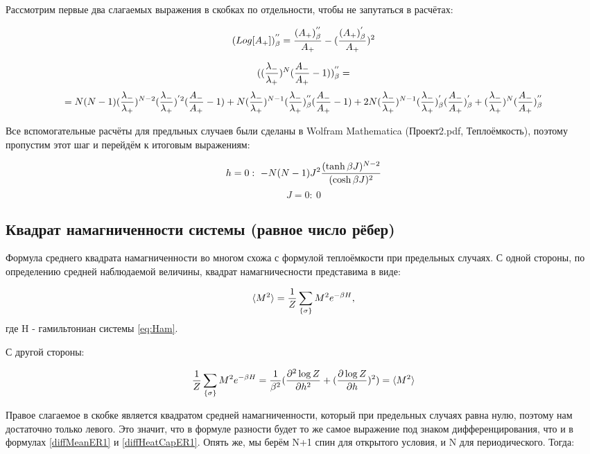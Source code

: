 Рассмотрим первые два слагаемых выражения в скобках по отдельности, чтобы не запутаться в расчётах:

\begin{equation*}
    (Log[A_{+}])^{''}_{\beta} = \frac{(A_{+})^{''}_{\beta}}{A_{+}} - (\frac{(A_{+})^{'}_{\beta}}{A_{+}})^{2}
\end{equation*}

\[ ((\frac{\lambda_{-}}{\lambda_{+}})^{N}(\frac{A_{-}}{A_{+}} - 1))^{''}_{\beta} = \]
\[ = N(N-1)(\frac{\lambda_{-}}{\lambda_{+}})^{N-2}(\frac{\lambda_{-}}{\lambda_{+}})^{'2}(\frac{A_{-}}{A_{+}} - 1) + N(\frac{\lambda_{-}}{\lambda_{+}})^{N-1}(\frac{\lambda_{-}}{\lambda_{+}})^{''}_{\beta}(\frac{A_{-}}{A_{+}} - 1) + 2N(\frac{\lambda_{-}}{\lambda_{+}})^{N-1}(\frac{\lambda_{-}}{\lambda_{+}})^{'}_{\beta}(\frac{A_{-}}{A_{+}})^{'}_{\beta} + (\frac{\lambda_{-}}{\lambda_{+}})^{N}(\frac{A_{-}}{A_{+}})^{''}_{\beta} \]

Все вспомогательные расчёты для предльных случаев были сделаны в Wolfram Mathematica (Проект2.pdf, Теплоёмкость)\cite{Git}, поэтому пропустим этот шаг и перейдём к итоговым выражениям:

\[ h = 0:\ -N(N-1)J^{2}\frac{(\tanh{\bj})^{N-2}}{(\cosh{\bj})^{2}} \]
\[ J = 0:\ 0\]

\subsection{Квадрат намагниченности системы (равное число рёбер)}

Формула среднего квадрата намагниченности во многом схожа с формулой теплоёмкости при предельных случаях. С одной стороны, по определению средней наблюдаемой величины, квадрат намагничесности представима в виде:

\begin{equation}
    \langle M^{2} \rangle = \frac{1}{Z} \sum_{\{\sigma\}} M^{2} e^{-\beta H},
\end{equation}
где H - гамильтониан системы \eqref{eq:Ham}.

С другой стороны:

\begin{equation}
    \frac{1}{Z} \sum_{\{\sigma\}} M^{2} e^{-\beta H} = \frac{1}{\beta^{2}}(\frac{\partial^{2} \log{Z}}{\partial h^{2}} + (\frac{\partial \log{Z}}{\partial h})^{2}) = \langle M^{2} \rangle
\end{equation}

Правое слагаемое в скобке является квадратом средней намагниченности, который при предельных случаях равна нулю, поэтому нам достаточно только левого. Это значит, что в формуле разности будет то же самое выражение под знаком дифференцирования, что и в формулах \eqref{diffMeanER1} и \eqref{diffHeatCapER1}. Опять же, мы берём N+1 спин для открытого условия, и N для периодического. Тогда:

